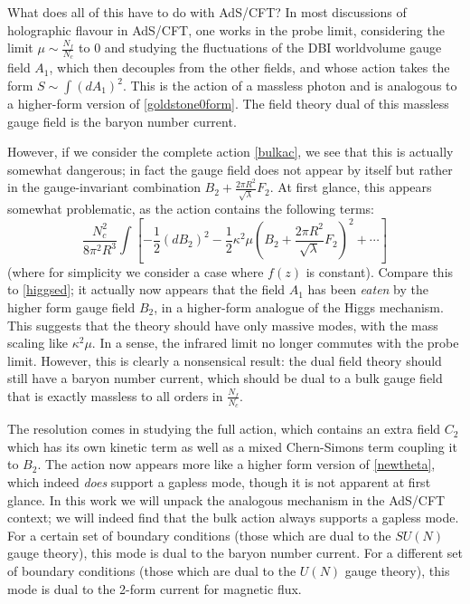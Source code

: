 \documentclass[aps,preprint,nofootinbib,preprintnumbers,eqsecnum,superscriptaddress]{revtex4}
\newcommand\lam{\lambda}
\newcommand{\ka}{{\kappa}}
\begin{document}
What does all of this have to do with AdS/CFT? In most discussions of holographic flavour in AdS/CFT, one works in the probe limit, considering the limit $\mu \sim \frac{N_f}{N_c}$ to $0$ and studying the fluctuations of the DBI worldvolume gauge field $A_1$, which then decouples from the other fields, and whose action takes the form $S \sim \int (dA_1)^2$. This is the action of a massless photon and is analogous to a higher-form version of \eqref{goldstone0form}. The field theory dual of this massless gauge field is the baryon number current. 

However, if we consider the complete action \eqref{bulkac}, we see that this is actually somewhat dangerous; in fact the gauge field does not appear by itself but rather in the gauge-invariant combination $B_2 + \frac{2 \pi R^2}{\sqrt{\lam}}F_2$. At first glance, this appears somewhat problematic, as the action contains the following terms:
\begin{equation}
	\frac{N_c^2}{8 \pi^2 R^3}\int\left[- \frac{1}{2} (dB_2)^2  - \frac{1}{2} \kappa^2 \mu \left(B_2 + \frac{2 \pi R^2}{\sqrt{\lambda}} F_2 \right)^2 + \cdots \right] 
\end{equation}
(where for simplicity we consider a case where $f(z)$ is constant). Compare this to \eqref{higgsed}; it actually now appears that the field $A_1$ has been {\it eaten} by the higher form gauge field $B_2$, in a higher-form analogue of the Higgs mechanism. This suggests that the theory should have only massive modes, with the mass scaling like $\ka^2\mu$. In a sense, the infrared limit no longer commutes with the probe limit. However, this is clearly a nonsensical result: the dual field theory should still have a baryon number current, which should be dual to a bulk gauge field that is exactly massless to all orders in $\frac{N_f}{N_c}$. 

The resolution comes in studying the full action, which contains an extra field $C_2$ which has its own kinetic term as well as a mixed Chern-Simons term coupling it to $B_2$. The action now appears more like a higher form version of \eqref{newtheta}, which indeed {\it does} support a gapless mode, though it is not apparent at first glance. In this work we will unpack the analogous mechanism in the AdS/CFT context; we will indeed find that the bulk action always supports a gapless mode. For a certain set of boundary conditions (those which are dual to the $SU(N)$ gauge theory), this mode is dual to the baryon number current. For a different set of boundary conditions (those which are dual to the $U(N)$ gauge theory), this mode is dual to the 2-form current for magnetic flux.  
\end{document}
